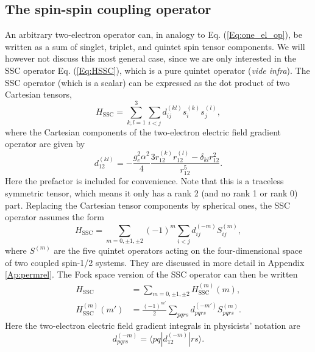 \subsection{The spin-spin coupling operator}
An arbitrary two-electron operator can, in analogy to Eq. (\ref{Eq:one_el_op}), be written as a sum of singlet, triplet, and quintet spin tensor components. We will however not discuss this most general case, since we are only interested in the SSC operator Eq. (\ref{Eq:HSSC}), which is a pure quintet operator (\textit{vide infra}). The SSC operator (which is a scalar) can be expressed as the dot product of two Cartesian tensors,
	\begin{equation}{H_{{\text{SSC}}}} = \sum\limits_{k,l = 1}^3 {\sum\limits_{i < j} {d_{ij}^{(kl)}} } s_i^{(k)}s_j^{(l)},
	\end{equation} 	
where the Cartesian components of the two-electron electric field gradient operator are given by
	\begin{equation}d_{12}^{(kl)} =  - \frac{{g_e^2{\alpha ^2}}}{4}\frac{{3r_{12}^{(k)}r_{12}^{(l)} - {\delta _{kl}}r_{12}^2}}{{r_{12}^5}}.
	\end{equation} 	
Here the prefactor is included for convenience. Note that this is a traceless symmetric tensor, which means it only has a rank 2 (and no rank 1 or rank 0) part.\cite{VahtrLMAaR_2002_133}
Replacing the Cartesian tensor components by spherical ones, the SSC operator assumes the form
	\begin{equation}{H_{{\text{SSC}}}} = \sum\limits_{m = 0, \pm 1, \pm 2} {{{( - 1)}^m}\sum\limits_{i < j} {d_{ij}^{( - m)}} S_{ij}^{(m)}}, 
	\end{equation} 	
where ${S^{(m)}}$ are the five quintet operators acting on the four-dimensional space of two coupled spin-1/2 systems. They are discussed in more detail in Appendix \ref{Ap:permrel}.
The Fock space version of the SSC operator can then be written
	\begin{align}
	\label{Eq:HSSC_irred_FS}
	{H_{{\text{SSC}}}} &= \sum\limits_{m = 0, \pm 1, \pm 2} {H_{{\text{SSC}}}^{(m)}(m)}, \\
	H_{{\text{SSC}}}^{(m)}(m') &= \frac{{{{( - 1)}^{m'}}}}{2}\sum\limits_{pqrs} {d_{pqrs}^{( - m')}S_{pqrs}^{(m)}}. 
	\end{align} 	
Here the two-electron electric field gradient integrals in physicists’ notation\cite{SzaboO_1996_} are
	\begin{equation}
	d_{pqrs}^{( - m)} = \langle pq|d_{12}^{( - m)}|rs\rangle. 
	\end{equation} 	

